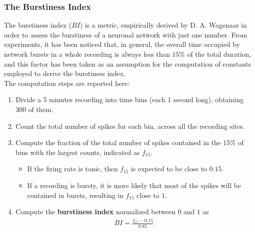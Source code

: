 \subsubsection{The Burstiness Index}
The burstiness index (\(BI\)) is a metric, empirically derived by D. A. Wagenaar in order
to assess the burstiness of a neuronal network with just one number. From experiments,
it has been noticed that, in general, the overall time occupied by network bursts in
a whole recording is always less than \(15\%\) of the total duration, and this factor
has been taken as an assumption for the computation of constants employed to derive
the burstiness index.\\
The computation steps are reported here:
\begin{enumerate}
    \item Divide a 5 minutes recording into time bins (each 1 second long), obtaining 300 of them.
    \item Count the total number of spikes for each bin, across all the recording sites.
    \item Compute the fraction of the total number of spikes contained in the \(15\%\)
          of bins with the largest counts, indicated as \(f_{15}\).
          \begin{itemize}
              \item If the firing rate is tonic, then \(f_{15}\) is expected to be close to \(0.15\).
              \item If a recording is bursty, it is more likely that most of the spikes will
                    be contained in bursts, resulting in \(f_{15}\) close to \(1\).
          \end{itemize}
    \item Compute the \textbf{burstiness index} normalized between \(0\) and \(1\) as
          \begin{align*}
              BI = \frac{f_{15}-0.15}{0.85}
          \end{align*}
\end{enumerate}

